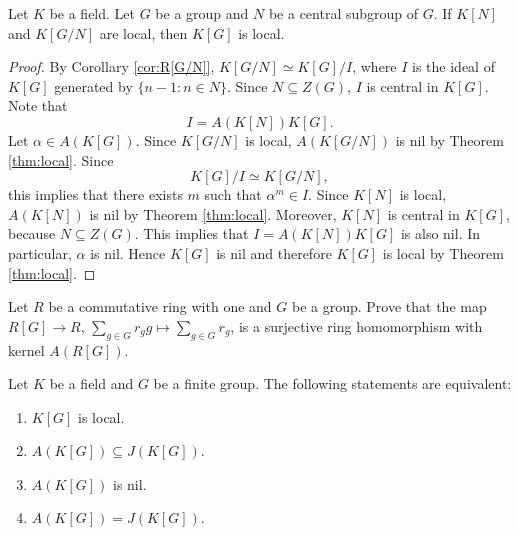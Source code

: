 \begin{corollary}
\label{cor:local_K[N]_and_K[G/N]}
    Let $K$ be a field. 
    Let $G$ be a group and $N$ be a central subgroup of $G$. If $K[N]$ and $K[G/N]$ are local, 
    then $K[G]$ is local. 
\end{corollary}

\begin{proof}
    By Corollary \ref{cor:R[G/N]}, $K[G/N]\simeq K[G]/I$, where 
    $I$ is the ideal of $K[G]$ generated by $\{n-1:n\in N\}$. Since $N\subseteq Z(G)$, 
    $I$ is central in $K[G]$. Note that 
    \[
    I=A(K[N])K[G].
    \]
    Let $\alpha\in A(K[G])$. 
    Since $K[G/N]$ is local, $A(K[G/N])$ is nil by Theorem \ref{thm:local}. Since 
    \[
    K[G]/I\simeq K[G/N],
    \]
    this implies that 
    there exists $m$ such that $\alpha^m\in I$. Since $K[N]$ is local,  
    $A(K[N])$ is nil by Theorem \ref{thm:local}. Moreover, $K[N]$ is central in $K[G]$, because $N\subseteq Z(G)$. This implies that $I=A(K[N])K[G]$ is also nil. In particular, 
    $\alpha$ is nil. Hence 
    $K[G]$ is nil and therefore $K[G]$ is local by Theorem \ref{thm:local}. 
\end{proof}


\begin{exercise}
\label{xca:augmentation}
    Let $R$ be a commutative ring with one and $G$ be a group. 
    Prove that 
    the map $R[G]\to R$, $\sum_{g\in G}r_gg\mapsto\sum_{g\in G}r_g$, is a surjective
    ring homomorphism with kernel $A(R[G])$.  
\end{exercise}

\begin{lemma}
    Let $K$ be a field and $G$ be a finite group. 
    The following statements are equivalent: 
    \begin{enumerate}
        \item $K[G]$ is local. 
        \item $A(K[G])\subseteq J(K[G])$. 
        \item $A(K[G])$ is nil.
        \item $A(K[G])=J(K[G])$. 
    \end{enumerate}
\end{lemma}

